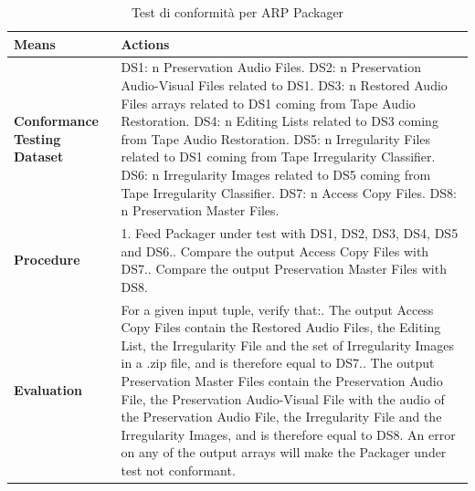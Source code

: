 \begin{table}[H]
    \centering
    \begin{tabular}{|p{}|p{}|}
        \hline
        \textbf{Means}   &   \textbf{Actions}\\
        \hline
        \textbf{Conformance Testing Dataset}    &
            DS1: n Preservation Audio Files.\newline
            DS2: n Preservation Audio-Visual Files related to DS1.\newline
            DS3: n Restored Audio Files arrays related to DS1 coming from Tape Audio Restoration.\newline
            DS4: n Editing Lists related to DS3 coming from Tape Audio Restoration.\newline
            DS5: n Irregularity Files related to DS1 coming from Tape Irregularity Classifier.\newline
            DS6: n Irregularity Images related to DS5 coming from Tape Irregularity Classifier.\newline
            DS7: n Access Copy Files.\newline
            DS8: n Preservation Master Files.\\
        \hline
        \textbf{Procedure}  &
            1.	Feed Packager under test with DS1, DS2, DS3, DS4, DS5 and DS6.\newline
            2.	Compare the output Access Copy Files with DS7.\newline
            3.	Compare the output Preservation Master Files with DS8.\\
        \hline
        \textbf{Evaluation} &
            For a given input tuple, verify that:\newline
                1.	The output Access Copy Files contain the Restored Audio Files, the Editing List, the Irregularity File and the set of Irregularity Images in a .zip file, and is therefore equal to DS7.\newline
                2.	The output Preservation Master Files contain the Preservation Audio File, the Preservation Audio-Visual File with the audio of the Preservation Audio File, the Irregularity File and the Irregularity Images, and is therefore equal to DS8.\newline
            An error on any of the output arrays will make the Packager under test not conformant.\\
        \hline
    \end{tabular}
    \caption{Test di conformità per \ac{ARP} Packager}
    \label{tab:packager-valutazione}
\end{table}

